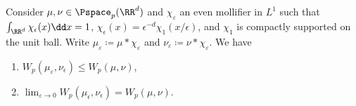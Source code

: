 \documentclass[oneside,reqno,letterpaper]{amsart}
\begin{document}
\begin{lemma}\label{prop:Wdist-convolution}
  Consider \(\mu, \nu \in \Pspace_p(\RR^d)\) and \(\chi_{\varepsilon}\) an even mollifier in \(L^1\) such that \(\int_{\RR^d} \chi_{\epsilon}(x) \dd x = 1\), \(\chi_{\epsilon}(x) = \epsilon^{-d} \chi_1(x / \epsilon)\), and \(\chi_1\) is compactly supported on the unit ball.
  Write \(\mu_{\varepsilon} \coloneqq \mu * \chi_{\varepsilon}\) and \(\nu_{\varepsilon} \coloneqq \nu * \chi_{\varepsilon}\).
  We have
  \begin{enumerate}[label=(\roman*)]
    \item \(W_p(\mu_{\varepsilon}, \nu_{\epsilon}) \leq W_p(\mu, \nu)\), 
    \item \(\lim_{\varepsilon \to 0} W_p(\mu_{\epsilon}, \nu_{\epsilon}) = W_p(\mu, \nu)\).
  \end{enumerate}
\end{lemma}
\end{document}
